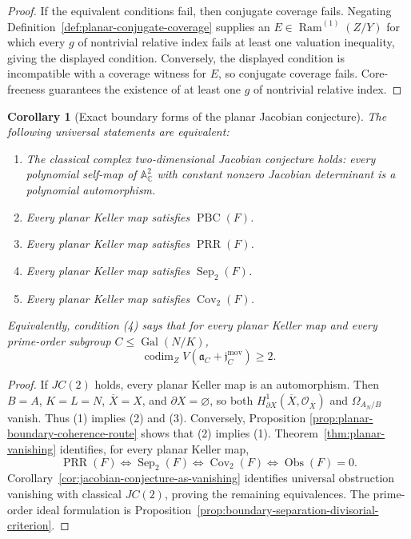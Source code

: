 \documentclass[11pt]{article}
\newtheorem{corollary}[theorem]{Corollary}
\theoremstyle{remark}
\theoremstyle{definition}
\DeclareMathOperator{\Ram}{Ram}
\newcommand{\A}{\mathbb A}
\newcommand{\C}{\mathbb C}
\newcommand{\Obs}{\operatorname{Obs}}
\begin{document}
\begin{proof}
If the equivalent conditions fail, then conjugate coverage fails.  Negating
Definition~\ref{def:planar-conjugate-coverage} supplies an
\(E\in\Ram^{(1)}(Z/Y)\) for which every \(g\) of nontrivial relative index
fails at least one valuation inequality, giving the displayed condition.
Conversely, the displayed condition is incompatible with a coverage witness
for \(E\), so conjugate coverage fails.  Core-freeness guarantees the
existence of at least one \(g\) of nontrivial relative index.
\end{proof}

\begin{corollary}[Exact boundary forms of the planar Jacobian conjecture]
\label{cor:planar-jc2-boundary-forms}
The following universal statements are equivalent:
\begin{enumerate}
  \item The classical complex two-dimensional Jacobian conjecture holds:
  every polynomial self-map of \(\A^2_{\C}\) with constant nonzero
  Jacobian determinant is a polynomial automorphism.
  \item Every planar Keller map satisfies \(\operatorname{PBC}(F)\).
  \item Every planar Keller map satisfies \(\operatorname{PRR}(F)\).
  \item Every planar Keller map satisfies \(\operatorname{Sep}_2(F)\).
  \item Every planar Keller map satisfies \(\operatorname{Cov}_2(F)\).
\end{enumerate}
Equivalently, condition \textup{(4)} says that for every planar Keller map
and every prime-order subgroup \(C\leq\operatorname{Gal}(N/K)\),
  \[
    \operatorname{codim}_Z
    V\!\left(\mathfrak a_C+\mathfrak j_C^{\mathrm{mov}}\right)
    \geq2.
  \]
\end{corollary}

\begin{proof}
If \(JC(2)\) holds, every planar Keller map is an automorphism.  Then
\(B=A\), \(K=L=N\), \(\overline X=X\), and \(\partial X=\varnothing\),
so both \(H^1_{\partial X}(\overline X,\mathcal O_{\overline X})\) and
\(\Omega_{A_N/B}\) vanish.  Thus \textup{(1)} implies
\textup{(2)} and \textup{(3)}.  Conversely, Proposition
\ref{prop:planar-boundary-coherence-route} shows that \textup{(2)} implies
\textup{(1)}.  Theorem~\ref{thm:planar-vanishing} identifies, for every
planar Keller map,
\[
  \operatorname{PRR}(F)
  \Longleftrightarrow
  \operatorname{Sep}_2(F)
  \Longleftrightarrow
  \operatorname{Cov}_2(F)
  \Longleftrightarrow
  \Obs(F)=0.
\]
Corollary~\ref{cor:jacobian-conjecture-as-vanishing} identifies universal
obstruction vanishing with classical \(JC(2)\), proving the remaining
equivalences.  The prime-order ideal formulation is
Proposition~\ref{prop:boundary-separation-divisorial-criterion}.
\end{proof}
\end{document}
